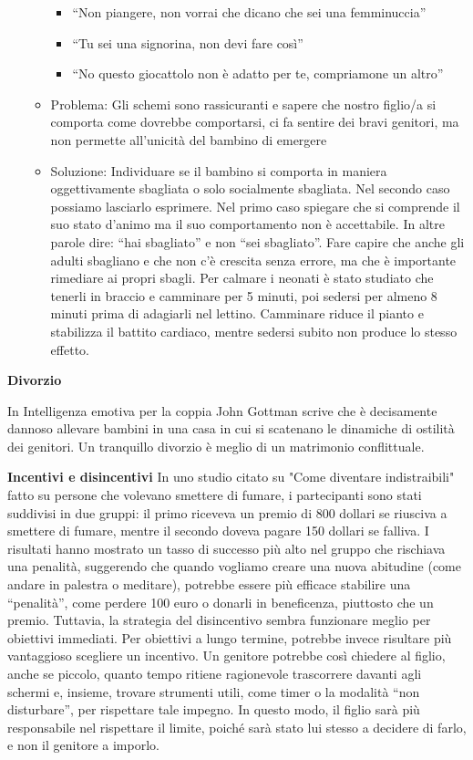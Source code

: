 \documentclass[12pt]{book} %
\begin{document}
\begin{itemize}
\begin{itemize}
\begin{itemize}
\item “Non piangere, non vorrai che dicano che sei una femminuccia”
\item “Tu sei una signorina, non devi fare così”
\item “No questo giocattolo non è adatto per te, compriamone un altro” 
\end{itemize}
\item Problema: Gli schemi sono rassicuranti e sapere che nostro figlio/a si comporta come dovrebbe comportarsi, ci fa
sentire dei bravi genitori, ma non permette all'unicità del bambino di emergere
\item Soluzione: Individuare se il bambino si comporta in maniera oggettivamente sbagliata o solo socialmente sbagliata.
Nel secondo caso possiamo lasciarlo esprimere. Nel primo caso spiegare che si comprende il suo stato
d'animo ma il suo comportamento non è accettabile. In altre parole dire: “hai sbagliato” e non
“sei sbagliato”. Fare capire che anche gli adulti sbagliano e che non c'è crescita senza errore, ma che è importante
rimediare ai propri sbagli. Per calmare i neonati è stato studiato che tenerli in braccio e camminare per 5 minuti, poi sedersi per almeno 8 minuti prima di adagiarli nel lettino. Camminare riduce il pianto e stabilizza il battito cardiaco, mentre sedersi subito non produce lo stesso effetto.
\end{itemize}
\end{itemize}

\textbf{Divorzio}

In Intelligenza emotiva per la coppia John Gottman scrive che è
decisamente dannoso allevare bambini in una casa in cui si scatenano le dinamiche di ostilità dei genitori. Un
tranquillo divorzio è meglio di un matrimonio conflittuale. 

\textbf{Incentivi e disincentivi}
In uno studio citato su "Come diventare indistraibili" fatto su persone che volevano smettere di fumare, i partecipanti sono stati suddivisi in due gruppi: il primo riceveva un premio di 800 dollari se riusciva a smettere di fumare, mentre il secondo doveva pagare 150 dollari se falliva. I risultati hanno mostrato un tasso di successo più alto nel gruppo che rischiava una penalità, suggerendo che quando vogliamo creare una nuova abitudine (come andare in palestra o meditare), potrebbe essere più efficace stabilire una “penalità”, come perdere 100 euro o donarli in beneficenza, piuttosto che un premio. Tuttavia, la strategia del disincentivo sembra funzionare meglio per obiettivi immediati. Per obiettivi a lungo termine, potrebbe invece risultare più vantaggioso scegliere un incentivo.
Un genitore potrebbe così chiedere al figlio, anche se piccolo, quanto tempo ritiene ragionevole trascorrere davanti agli schermi e, insieme, trovare strumenti utili, come timer o la modalità “non disturbare”, per rispettare tale impegno. In questo modo, il figlio sarà più responsabile nel rispettare il limite, poiché sarà stato lui stesso a decidere di farlo, e non il genitore a imporlo.
\end{document}
